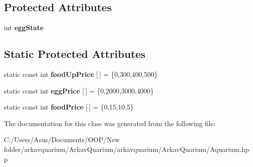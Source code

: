 \subsection*{Protected Attributes}
\begin{DoxyCompactItemize}
\item 
\mbox{\label{class_aquarium_af20d348c2f202d514383820440df7e1c}} 
int {\bfseries egg\+State}
\end{DoxyCompactItemize}
\subsection*{Static Protected Attributes}
\begin{DoxyCompactItemize}
\item 
\mbox{\label{class_aquarium_a20ac94b3e0d1dbfa683751599900b68f}} 
static const int {\bfseries food\+Up\+Price} \mbox{[}$\,$\mbox{]} = \{0,300,400,500\}
\item 
\mbox{\label{class_aquarium_aeddefcb3757ab680306a3dc12765f791}} 
static const int {\bfseries egg\+Price} \mbox{[}$\,$\mbox{]} = \{0,2000,3000,4000\}
\item 
\mbox{\label{class_aquarium_a0c66fead918aa90dbe07d7e5a110d408}} 
static const int {\bfseries food\+Price} \mbox{[}$\,$\mbox{]} = \{0,15,10,5\}
\end{DoxyCompactItemize}


The documentation for this class was generated from the following file\+:\begin{DoxyCompactItemize}
\item 
C\+:/\+Users/\+Asus/\+Documents/\+O\+O\+P/\+New folder/arkavquarium/\+Arkav\+Quarium/arkavquarium/\+Arkav\+Quarium/Aquarium.\+hpp\end{DoxyCompactItemize}
